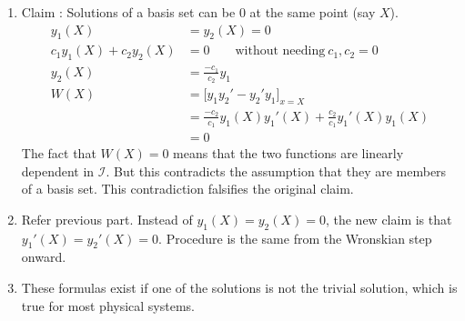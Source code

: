 \begin{enumerate}
\begin{enumerate}
              \item Claim : Solutions of a basis set can be $ 0 $ at the same point
                    (say $ X $).
                    \begin{align}
                        y_{1}(X)                      & = y_{2}(X) = 0              \\
                        c_{1}y_{1}(X) + c_{2}y_{2}(X) & = 0 \qquad
                        \text{without needing}\ c_{1}, c_{2} = 0                    \\
                        y_{2}(X)                      & = \frac{-c_{1}}{c_{2}}y_{1} \\
                        W(X)                          & =  \Bigg[ y_{1}y_{2}'
                        - y_{2}'y_{1} \Bigg]_{x = X}                                \\
                                                      & = \frac{-c_{2}}
                        {c_{1}}y_{1}(X)y_{1}'(X)
                        + \frac{c_{2}}{c_{1}}
                        y_{1}'(X)y_{1}(X)                                           \\
                                                      & = 0
                    \end{align}
                    The fact that $ W(X) = 0 $ means that the two functions are linearly
                    dependent in $ \mathcal{I} $. But this contradicts the assumption
                    that they are members of a basis set. This contradiction falsifies
                    the original claim.

              \item Refer previous part. Instead of $ y_{1}(X) = y_{2}(X) = 0 $, the new
                    claim is that $ y_{1}'(X) = y_{2}'(X) = 0 $.
                    Procedure is the same from the Wronskian step onward.

              \item These formulas exist if one of the solutions is not the trivial
                    solution, which is true for most physical systems.


\end{enumerate}
\end{enumerate}

